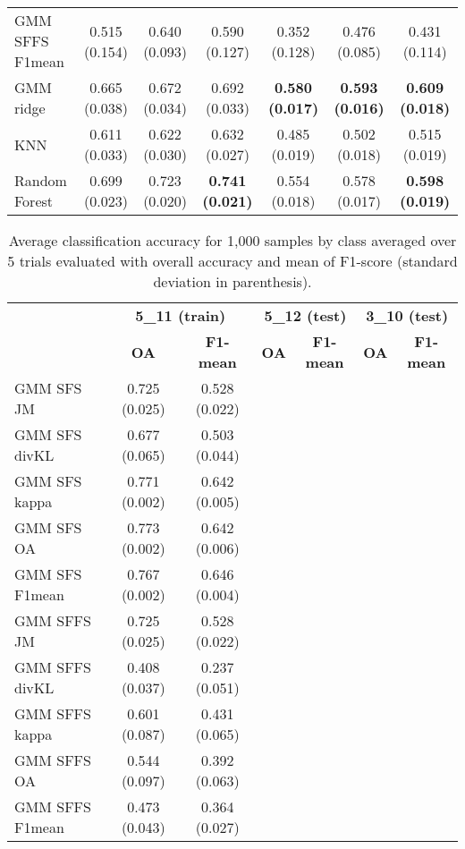 \documentclass[a4paper,10pt,DIV=16]{scrartcl}
\begin{document}
\begin{table}[!t]
\begin{tabular}{lcccccc}
            GMM SFFS F1mean & 0.515 (0.154) & 0.640 (0.093) & 0.590 (0.127) & 0.352 (0.128) & 0.476 (0.085) & 0.431 (0.114) \\
            GMM ridge &       0.665 (0.038) & 0.672 (0.034) & 0.692 (0.033) & {\bfseries 0.580 (0.017)} & {\bfseries 0.593 (0.016)} & {\bfseries 0.609 (0.018)} \\
            KNN &             0.611 (0.033) & 0.622 (0.030) & 0.632 (0.027) & 0.485 (0.019) & 0.502 (0.018) & 0.515 (0.019) \\
            Random Forest &   0.699 (0.023) & 0.723 (0.020) & {\bfseries 0.741 (0.021)} & 0.554 (0.018) & 0.578 (0.017) & {\bfseries 0.598 (0.019)} \\
            \bottomrule
        \end{tabular}
    \end{table}

    \begin{table}[!t]
        \centering
        \caption{Average classification accuracy for 1,000 samples by class averaged over 5 trials  evaluated with overall accuracy and mean of F1-score (standard deviation in parenthesis).\label{tab:potsdam-otbsimu-othereval}}
        \begin{tabular}{lcccccc}\toprule
             & \multicolumn{2}{c}{\bfseries 5\_11 (train)} & \multicolumn{2}{c}{\bfseries 5\_12 (test)} & \multicolumn{2}{c}{\bfseries 3\_10 (test)} \\ \cmidrule{2-7}
             & {\bfseries OA} & {\bfseries F1-mean} & {\bfseries OA} & {\bfseries F1-mean} & {\bfseries OA} & {\bfseries F1-mean} \\ \cmidrule{2-7}

            GMM SFS JM &      0.725 (0.025) & 0.528 (0.022) &  &&&\\
            GMM SFS divKL &   0.677 (0.065) & 0.503 (0.044) &  &&&\\
            GMM SFS kappa &   0.771 (0.002) & 0.642 (0.005) &  &&&\\
            GMM SFS OA &      0.773 (0.002) & 0.642 (0.006) &  &&&\\
            GMM SFS F1mean &  0.767 (0.002) & 0.646 (0.004) &  &&&\\
            GMM SFFS JM &     0.725 (0.025) & 0.528 (0.022) &  &&&\\
            GMM SFFS divKL &  0.408 (0.037) & 0.237 (0.051) &  &&&\\
            GMM SFFS kappa &  0.601 (0.087) & 0.431 (0.065) &  &&&\\
            GMM SFFS OA &     0.544 (0.097) & 0.392 (0.063) &  &&&\\
            GMM SFFS F1mean & 0.473 (0.043) & 0.364 (0.027) &  &&&\\
            \bottomrule
        \end{tabular}
    \end{table}
\end{document}
